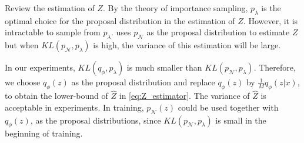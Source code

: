 Review the estimation of $Z$. By the theory of importance sampling, $p_\lambda$ is the optimal choice for the proposal distribution in the estimation of $Z$. However, it is intractable to sample from $p_\lambda$. 
\cite{bauer2019resampled} uses $p_\mathcal{N}$ as the proposal distribution to estimate $Z$ but when $KL(p_\mathcal{N}, p_\lambda)$ is high, the variance of this estimation will be large. 

In our experiments, $KL(q_\phi, p_\lambda)$ is much smaller than $KL(p_\mathcal{N}, p_\lambda)$. Therefore, we choose $q_\phi(z)$ as the proposal distribution and replace $q_\phi(z)$ by $\frac{1}{M}q_\phi(z|x)$, to obtain the lower-bound of $\hat{Z}$ in \cref{eq:Z_estimator}. The variance of $\hat{Z}$ is acceptable in experiments.  
In training, $p_\mathcal{N}(z)$ could be used together with $q_\phi(z)$, as the proposal distributions, since $KL(p_\mathcal{N}, p_\lambda)$ is small in the beginning of training.
 